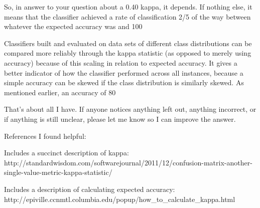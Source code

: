So, in answer to your question about a 0.40 kappa, it depends. If nothing else, it means that the classifier achieved a rate of classification 2/5 of the way between whatever the expected accuracy was and 100%

Classifiers built and evaluated on data sets of different class distributions can be compared more reliably through the kappa statistic (as opposed to merely using accuracy) because of this scaling in relation to expected accuracy. It gives a better indicator of how the classifier performed across all instances, because a simple accuracy can be skewed if the class distribution is similarly skewed. As mentioned earlier, an accuracy of 80%

That's about all I have. If anyone notices anything left out, anything incorrect, or if anything is still unclear, please let me know so I can improve the answer.

References I found helpful:

Includes a succinct description of kappa: http://standardwisdom.com/softwarejournal/2011/12/confusion-matrix-another-single-value-metric-kappa-statistic/

Includes a description of calculating expected accuracy: http://epiville.ccnmtl.columbia.edu/popup/how_to_calculate_kappa.html

